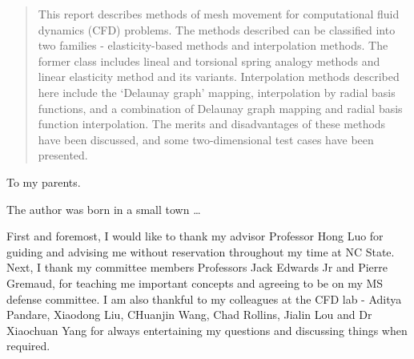 \begin{abstract}

This report describes methods of mesh movement for computational fluid dynamics (CFD) problems. The methods described can be classified into two families - elasticity-based methods and interpolation methods. The former class includes lineal and torsional spring analogy methods and linear elasticity method and its variants. Interpolation methods described here include the `Delaunay graph' mapping, interpolation by radial basis functions, and a combination of Delaunay graph mapping and radial basis function interpolation. The merits and disadvantages of these methods have been discussed, and some two-dimensional test cases have been presented.
\end{abstract}


\makecopyrightpage

\maketitlepage

\begin{dedication}
 \centering To my parents.
\end{dedication}

\begin{biography}
The author was born in a small town \ldots
\end{biography}

\begin{acknowledgements}
First and foremost, I would like to thank my advisor Professor Hong Luo for guiding and advising me without reservation throughout my time at NC State. Next, I thank my committee members Professors Jack Edwards Jr and Pierre Gremaud, for teaching me important concepts and agreeing to be on my MS defense committee. I am also thankful to my colleagues at the CFD lab - Aditya Pandare, Xiaodong Liu, CHuanjin Wang, Chad Rollins, Jialin Lou and Dr Xiaochuan Yang for always entertaining my questions and discussing things when required.
\end{acknowledgements}


\thesistableofcontents

\thesislistoftables

\thesislistoffigures
